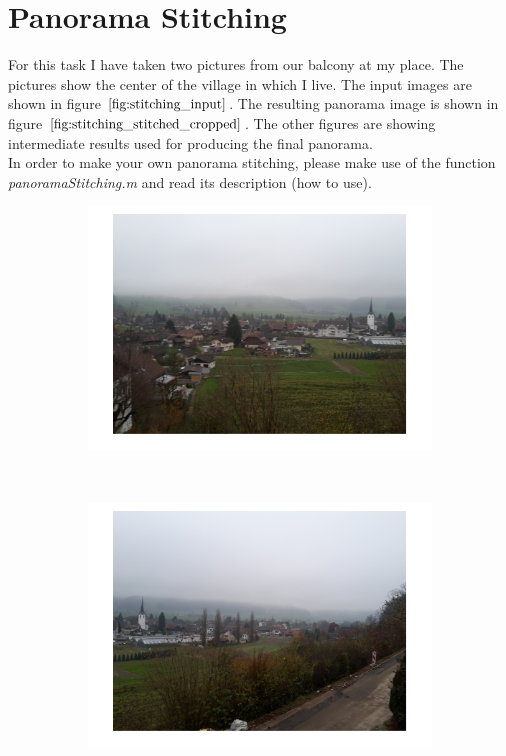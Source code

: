 \documentclass{paper}
\begin{document}
\section{Panorama Stitching}
For this task I have taken two pictures from our balcony at my place. The pictures show the center of the village in which I live. The input images are shown in figure $\ref{fig:stitching_input}$. The resulting panorama image is shown in figure $\ref{fig:stitching_stitched_cropped}$. The other figures are showing intermediate results used for producing the final panorama. \\

In order to make your own panorama stitching, please make use of the function \emph{panoramaStitching.m} and read its description (how to use).

\begin{figure}[H]
    \centering
    \begin{subfigure}{0.45\textwidth}
        \includegraphics[width=\textwidth]{stitching/left_input_1}
    \end{subfigure}
    ~
        \begin{subfigure}{0.45\textwidth}
        \includegraphics[width=\textwidth]{stitching/right_input_1}
    \end{subfigure}
    

\end{figure}
\end{document}
